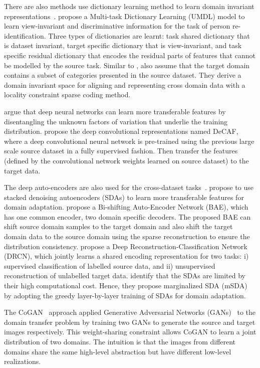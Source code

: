 \documentclass[prodmode]{acmsmall}  %
\begin{document}
There are also methods use dictionary learning method to learn domain invariant representations~\cite{Peng2016,Tsai2016}.  propose a Multi-task Dictionary Learning (UMDL) model to learn view-invariant and discriminative information for the task of person re-identification. Three types of dictionaries are learnt: task shared dictionary that is dataset invariant, target specific dictionary that is view-invariant, and task specific residual dictionary that encodes the residual parts of features that cannot be modelled by the source task. Similar to \cite{Hsu2015},  also assume that the target domain contains a subset of categories presented in the source dataset. 
They derive a domain invariant space for aligning and representing cross domain data with a locality constraint sparse coding method.

 argue that deep neural networks can learn more transferable features by disentangling the unknown factors of variation that underlie the training distribution.
 propose the deep convolutional representations named DeCAF, where a deep convolutional neural network is pre-trained using the previous large scale source dataset in a fully supervised fashion. Then transfer the features (defined by the convolutional network weights learned on source dataset) to the target data.

The deep auto-encoders are also used for the cross-dataset tasks~\cite{Glorot2011,Kan2015,Chen2012,Jiang2016,Ghifary2016a}.  propose to use stacked denoising autoencoders (SDAs) to learn more transferable features for domain adaptation.  propose a Bi-shifting Auto-Encoder Network (BAE), which has one common encoder, two domain specific decoders. The proposed BAE can shift source domain samples to the target domain and also shift the target domain data to the source domain using the sparse reconstruction to ensure the distribution consistency.  propose a Deep Reconstruction-Classification Network (DRCN), which jointly learns a shared encoding representation for two tasks: i) supervised classification of labelled source data, and ii) unsupervised reconstruction of unlabelled target data.  identify that the SDAs are limited by their high computational cost. Hence, they propose marginalized SDA (mSDA) by adopting the greedy layer-by-layer training of SDAs for domain adaptation.

The CoGAN~\cite{Liu2016} approach applied Generative Adversarial Networks (GANs)~\cite{Goodfellow2014} to the domain transfer problem by training two GANs to generate the source and target images respectively. This weight-sharing constraint allows CoGAN to learn a joint distribution of two domains. The intuition is that the images from different domains share the same high-level abstraction but have different low-level realizations.
\end{document}

